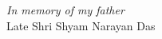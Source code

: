 \doublespacing
\newpage
\thispagestyle{empty}
\begin{center}
\vspace*{250px}
\textit{In memory of my father}\\
 Late Shri Shyam Narayan Das
\end{center}

